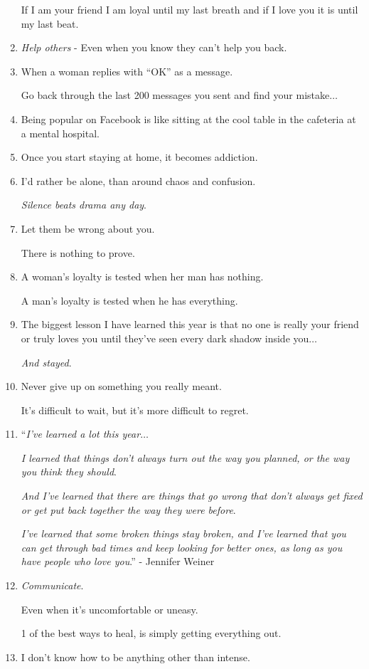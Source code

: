 \documentclass{article}
\begin{document}
\begin{enumerate}
	If I am your friend I am loyal until my last breath and if I love you it is until my last beat.
	\item \textit{Help others} - Even when you know they can't help you back.
	\item When a woman replies with ``OK'' as a message.
	
	Go back through the last 200 messages you sent and find your mistake$\ldots$
	\item Being popular on Facebook is like sitting at the cool table in the cafeteria at a mental hospital.
	\item Once you start staying at home, it becomes addiction.
	\item I'd rather be alone, than around chaos and confusion.
	
	\textit{Silence beats drama any day}.
	\item Let them be wrong about you.
	
	There is nothing to prove.
	\item A woman's loyalty is tested when her man has nothing.
	
	A man's loyalty is tested when he has everything.
	\item The biggest lesson I have learned this year is that no one is really your friend or truly loves you until they've seen every dark shadow inside you$\ldots$
	
	\textit{And stayed}.
	\item Never give up on something you really meant.
	
	It's difficult to wait, but it's more difficult to regret.
	\item ``\textit{I've learned a lot this year}$\ldots$
	
	\textit{I learned that things don't always turn out the way you planned, or the way you think they should}.
	
	\textit{And I've learned that there are things that go wrong that don't always get fixed or get put back together the way they were before}.
	
	\textit{ I've learned that some broken things stay broken, and I've learned that you can get through bad times and keep looking for better ones, as long as you have people who love you}.'' - Jennifer Weiner
	\item \textit{Communicate}.
	
	Even when it's uncomfortable or uneasy.
	
	1 of the best ways to heal, is simply getting everything out.
	\item I don't know how to be anything other than intense.
	

\end{enumerate}
\end{document}
